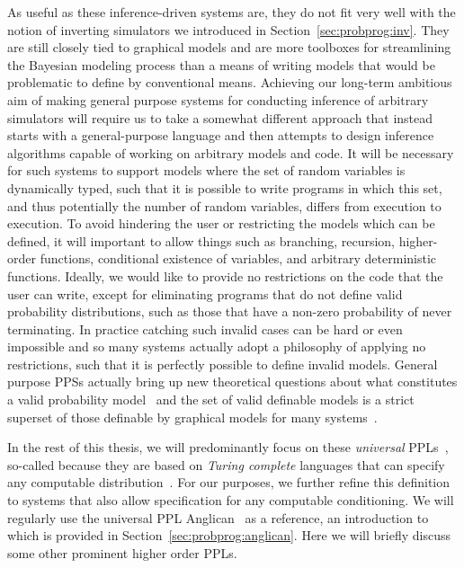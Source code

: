 As useful as these inference-driven systems are, they do not fit very well with the notion of
inverting simulators we introduced in Section~\ref{sec:probprog:inv}.  They are still closely tied
to graphical models and are more toolboxes for streamlining the Bayesian modeling process than
a means of writing models that would be problematic to define by conventional means.  Achieving
our long-term ambitious aim of making general purpose systems for conducting inference of
arbitrary simulators will require us to take a somewhat different approach that instead starts
with a general-purpose language and then attempts to design inference algorithms capable of
working on arbitrary models and code.  It will be necessary for such systems to
support models where the set of random variables is dynamically typed, such that it is possible 
to write programs in which this set, and thus potentially the number of random variables, differs 
from execution to execution.  To avoid hindering the user or restricting the models which can be
defined, it will important to allow 
things such as branching, recursion, higher-order functions,
conditional existence of variables, and arbitrary
deterministic functions.  Ideally, we would like to provide no restrictions on the code that the user
can write, except for eliminating programs that do not define valid probability distributions, such as
those that have a non-zero probability of never terminating.  In practice catching such invalid cases can
be hard or even impossible and so many systems actually adopt a philosophy of applying no restrictions,
such that it is perfectly possible to define invalid models.  General purpose PPSs actually bring up new
theoretical questions about what constitutes a valid probability model~\citep{heunen2017convenient} and
the set of valid definable models is a strict superset of those definable by graphical models 
for many systems~\citep{goodman2013principles}.

In the rest of this thesis, we will predominantly focus on these \emph{universal} PPLs~\citep{goodman_uai_2008,staton2016semantics}, 
so-called because they are based on \emph{Turing complete} languages that can specify any
computable distribution~\citep{goodman2013principles}.  For our purposes, we further refine this definition
to systems that also allow specification for any computable conditioning.
We will regularly use the universal PPL Anglican~\citep{wood2014new} as a reference, an introduction
to which is provided in Section~\ref{sec:probprog:anglican}. Here we will briefly discuss some other
prominent higher order PPLs.

